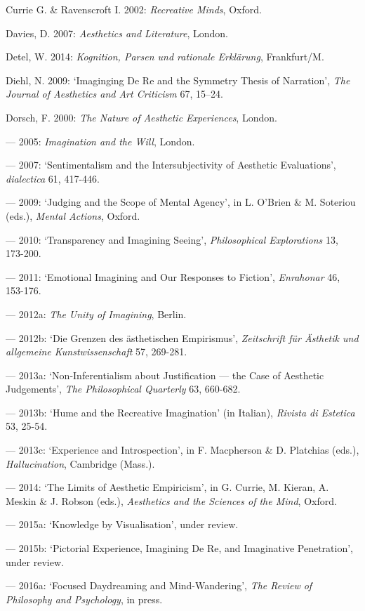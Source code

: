 \begin{hangparas}{.5cm}{1}
Currie G. \& Ravenscroft I. 2002: \emph{Recreative Minds}, Oxford.

Davies, D. 2007: \emph{Aesthetics and Literature}, London.

Detel, W. 2014: \emph{Kognition, Parsen und rationale Erkl\"arung}, Frankfurt/M.

Diehl, N. 2009: `Imaginging De Re and the Symmetry Thesis of Narration', \emph{The Journal of Aesthetics and Art Criticism} 67, 15--24.

Dorsch, F. 2000: \emph{The Nature of Aesthetic Experiences}, London.

--- 2005: \emph{Imagination and the Will}, London.
 
--- 2007: `Sentimentalism and the Intersubjectivity of Aesthetic Evaluations', \emph{dialectica} 61, 417-446. 
 
--- 2009: `Judging and the Scope of Mental Agency', in L. O'Brien \& M. Soteriou (eds.), \emph{Mental Actions}, Oxford. 
 
--- 2010: `Transparency and Imagining Seeing', \emph{Philosophical Explorations} 13, 173-200. 
 
--- 2011: `Emotional Imagining and Our Responses to Fiction', \emph{Enrahonar} 46, 153-176. 
 
--- 2012a: \emph{The Unity of Imagining}, Berlin.

--- 2012b: `Die Grenzen des \"asthetischen Empirismus', \emph{Zeitschrift f\"ur \"Asthetik und allgemeine Kunstwissenschaft} 57, 269-281.
 
--- 2013a: `Non-Inferentialism about Justification --- the Case of Aesthetic Judgements', \emph{The Philosophical Quarterly} 63, 660-682.

--- 2013b: `Hume and the Recreative Imagination' (in Italian), \emph{Rivista di Estetica} 53, 25-54. 

--- 2013c: `Experience and Introspection', in F. Macpherson \& D. Platchias (eds.), \emph{Hallucination}, Cambridge (Mass.). 

--- 2014: `The Limits of Aesthetic Empiricism', in G. Currie, M. Kieran, A. Meskin \& J. Robson (eds.), \emph{Aesthetics and the Sciences of the Mind}, Oxford. 

--- 2015a: `Knowledge by Visualisation', under review.

--- 2015b: `Pictorial Experience, Imagining De Re, and Imaginative Penetration', under review.

--- 2016a: `Focused Daydreaming and Mind-Wandering', \emph{The Review of Philosophy and Psychology}, in press.
 

\end{hangparas}
